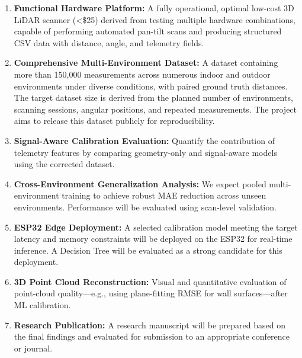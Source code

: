 \documentclass[12pt,a4paper]{article}
\begin{document}
    \begin{enumerate}[leftmargin=0.35in]
        \item \textbf{Functional Hardware Platform:} A fully operational, optimal low-cost 3D LiDAR scanner (<\$25) derived from testing multiple hardware combinations, capable of performing automated pan-tilt scans and producing structured CSV data with distance, angle, and telemetry fields.

        \item \textbf{Comprehensive Multi-Environment Dataset:} A dataset containing more than 150,000 measurements across numerous indoor and outdoor environments under diverse conditions, with paired ground truth distances. The target dataset size is derived from the planned number of environments, scanning sessions, angular positions, and repeated measurements. The project aims to release this dataset publicly for reproducibility.

        \item \textbf{Signal-Aware Calibration Evaluation:} Quantify the contribution of telemetry features by comparing geometry-only and signal-aware models using the corrected dataset.

        \item \textbf{Cross-Environment Generalization Analysis:} We expect pooled multi-environment training to achieve robust MAE reduction across unseen environments. Performance will be evaluated using scan-level validation.

        \item \textbf{ESP32 Edge Deployment:} A selected calibration model meeting the target latency and memory constraints will be deployed on the ESP32 for real-time inference. A Decision Tree will be evaluated as a strong candidate for this deployment.

        \item \textbf{3D Point Cloud Reconstruction:} Visual and quantitative evaluation of point-cloud quality---e.g., using plane-fitting RMSE for wall surfaces---after ML calibration.

        \item \textbf{Research Publication:} A research manuscript will be prepared based on the final findings and evaluated for submission to an appropriate conference or journal.
    \end{enumerate}


\end{document}
